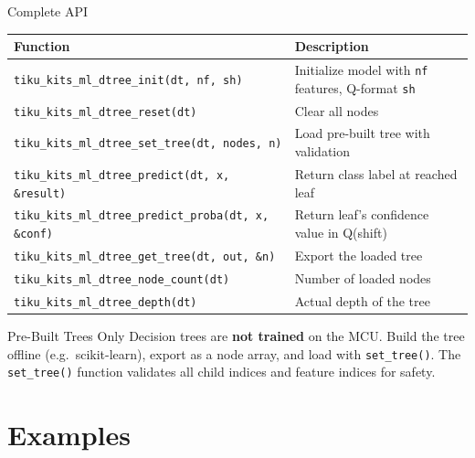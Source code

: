 \documentclass[aspectratio=169, 10pt]{beamer}
\begin{document}
\begin{frame}[fragile]{Complete API}
\begin{table}
\centering
\small
\begin{tabular}{@{}lp{8cm}@{}}
\toprule
\textbf{Function} & \textbf{Description} \\
\midrule
\texttt{tiku\_kits\_ml\_dtree\_init(dt, nf, sh)}
  & Initialize model with \texttt{nf} features, Q-format \texttt{sh} \\
\texttt{tiku\_kits\_ml\_dtree\_reset(dt)}
  & Clear all nodes \\
\texttt{tiku\_kits\_ml\_dtree\_set\_tree(dt, nodes, n)}
  & Load pre-built tree with validation \\
\midrule
\texttt{tiku\_kits\_ml\_dtree\_predict(dt, x, \&result)}
  & Return class label at reached leaf \\
\texttt{tiku\_kits\_ml\_dtree\_predict\_proba(dt, x, \&conf)}
  & Return leaf's confidence value in Q(shift) \\
\midrule
\texttt{tiku\_kits\_ml\_dtree\_get\_tree(dt, out, \&n)}
  & Export the loaded tree \\
\texttt{tiku\_kits\_ml\_dtree\_node\_count(dt)}
  & Number of loaded nodes \\
\texttt{tiku\_kits\_ml\_dtree\_depth(dt)}
  & Actual depth of the tree \\
\bottomrule
\end{tabular}
\end{table}

\vspace{0.3em}
\begin{alertblock}{Pre-Built Trees Only}
Decision trees are \textbf{not trained} on the MCU. Build the tree offline
(e.g.\ scikit-learn), export as a node array, and load with
\texttt{set\_tree()}. The \texttt{set\_tree()} function validates all
child indices and feature indices for safety.
\end{alertblock}
\end{frame}

\section{Examples}
\end{document}
